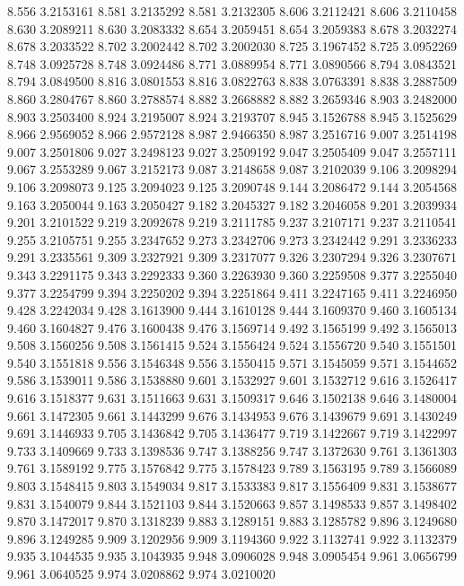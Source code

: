 8.556 3.2153161
8.581 3.2135292
8.581 3.2132305
8.606 3.2112421
8.606 3.2110458
8.630 3.2089211
8.630 3.2083332
8.654 3.2059451
8.654 3.2059383
8.678 3.2032274
8.678 3.2033522
8.702 3.2002442
8.702 3.2002030
8.725 3.1967452
8.725 3.0952269
8.748 3.0925728
8.748 3.0924486
8.771 3.0889954
8.771 3.0890566
8.794 3.0843521
8.794 3.0849500
8.816 3.0801553
8.816 3.0822763
8.838 3.0763391
8.838 3.2887509
8.860 3.2804767
8.860 3.2788574
8.882 3.2668882
8.882 3.2659346
8.903 3.2482000
8.903 3.2503400
8.924 3.2195007
8.924 3.2193707
8.945 3.1526788
8.945 3.1525629
8.966 2.9569052
8.966 2.9572128
8.987 2.9466350
8.987 3.2516716
9.007 3.2514198
9.007 3.2501806
9.027 3.2498123
9.027 3.2509192
9.047 3.2505409
9.047 3.2557111
9.067 3.2553289
9.067 3.2152173
9.087 3.2148658
9.087 3.2102039
9.106 3.2098294
9.106 3.2098073
9.125 3.2094023
9.125 3.2090748
9.144 3.2086472
9.144 3.2054568
9.163 3.2050044
9.163 3.2050427
9.182 3.2045327
9.182 3.2046058
9.201 3.2039934
9.201 3.2101522
9.219 3.2092678
9.219 3.2111785
9.237 3.2107171
9.237 3.2110541
9.255 3.2105751
9.255 3.2347652
9.273 3.2342706
9.273 3.2342442
9.291 3.2336233
9.291 3.2335561
9.309 3.2327921
9.309 3.2317077
9.326 3.2307294
9.326 3.2307671
9.343 3.2291175
9.343 3.2292333
9.360 3.2263930
9.360 3.2259508
9.377 3.2255040
9.377 3.2254799
9.394 3.2250202
9.394 3.2251864
9.411 3.2247165
9.411 3.2246950
9.428 3.2242034
9.428 3.1613900
9.444 3.1610128
9.444 3.1609370
9.460 3.1605134
9.460 3.1604827
9.476 3.1600438
9.476 3.1569714
9.492 3.1565199
9.492 3.1565013
9.508 3.1560256
9.508 3.1561415
9.524 3.1556424
9.524 3.1556720
9.540 3.1551501
9.540 3.1551818
9.556 3.1546348
9.556 3.1550415
9.571 3.1545059
9.571 3.1544652
9.586 3.1539011
9.586 3.1538880
9.601 3.1532927
9.601 3.1532712
9.616 3.1526417
9.616 3.1518377
9.631 3.1511663
9.631 3.1509317
9.646 3.1502138
9.646 3.1480004
9.661 3.1472305
9.661 3.1443299
9.676 3.1434953
9.676 3.1439679
9.691 3.1430249
9.691 3.1446933
9.705 3.1436842
9.705 3.1436477
9.719 3.1422667
9.719 3.1422997
9.733 3.1409669
9.733 3.1398536
9.747 3.1388256
9.747 3.1372630
9.761 3.1361303
9.761 3.1589192
9.775 3.1576842
9.775 3.1578423
9.789 3.1563195
9.789 3.1566089
9.803 3.1548415
9.803 3.1549034
9.817 3.1533383
9.817 3.1556409
9.831 3.1538677
9.831 3.1540079
9.844 3.1521103
9.844 3.1520663
9.857 3.1498533
9.857 3.1498402
9.870 3.1472017
9.870 3.1318239
9.883 3.1289151
9.883 3.1285782
9.896 3.1249680
9.896 3.1249285
9.909 3.1202956
9.909 3.1194360
9.922 3.1132741
9.922 3.1132379
9.935 3.1044535
9.935 3.1043935
9.948 3.0906028
9.948 3.0905454
9.961 3.0656799
9.961 3.0640525
9.974 3.0208862
9.974 3.0210020
